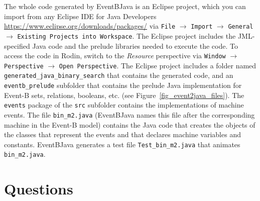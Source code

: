 \documentclass{article} %
\newcommand{\eb}{\textsf{Event-B}\xspace}
\newcommand{\jml}{\textsf{JML}\xspace}
\newcommand{\ebtj}{\textsf{Event\-B\-2\-Java}\xspace}
\begin{document}
The whole code generated by \ebtj is an Eclipse project, which you can import from any Eclipse IDE for Java Developers \href{https://www.eclipse.org/downloads/packages/} {https://\-www.\-eclipse.\-org/\-downloads/\-packages/} via \texttt{File} $\rightarrow$ \texttt{Import} $\rightarrow$ \texttt{General} $\rightarrow$ \texttt{Existing Projects into Workspace}. The Eclipse project includes the \jml-specified Java code and the prelude libraries needed to execute the code. To access the code in Rodin, switch to the \emph{Resource} perspective via \texttt{Window} $\rightarrow$ \texttt{Perspective} $\rightarrow$ \texttt{Open Perspective}. The Eclipse project includes a folder named \texttt{generated\_\-java\_\-binary\_\-search} that contains the generated code, and an \texttt{eventb\_\-prelude} subfolder that contains the prelude Java implementation for \eb sets, relations, booleans, etc. (see Figure~\ref{fig_event2java_files}). The \texttt{events} package of the \texttt{src} subfolder contains the implementations of machine events. The file \texttt{bin\_\-m2.java} (\ebtj names this file after the corresponding machine in the \eb model) contains the Java code that creates the objects of the classes that represent the events and that declares machine variables and constants. \ebtj generates a test file \texttt{Test\_\-bin\_\-m2.java} that animates \texttt{bin\_\-m2.java}. 

\section*{Questions}
\label{subsec_questions}
\end{document}
